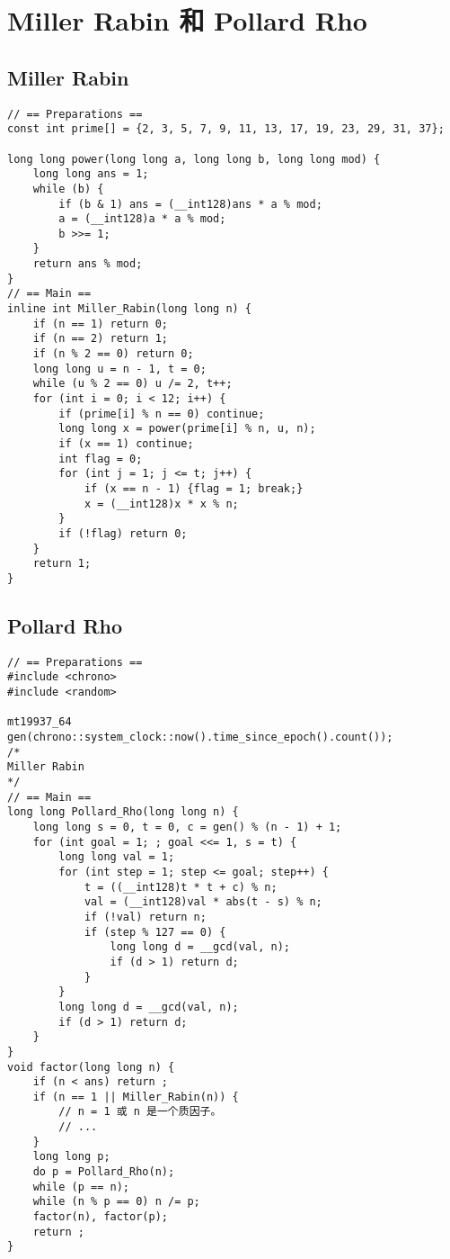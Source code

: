 \section{Miller Rabin 和 Pollard Rho}

\subsection{Miller Rabin}

\begin{verbatim}
// == Preparations ==
const int prime[] = {2, 3, 5, 7, 9, 11, 13, 17, 19, 23, 29, 31, 37};

long long power(long long a, long long b, long long mod) {
    long long ans = 1;
    while (b) {
        if (b & 1) ans = (__int128)ans * a % mod;
        a = (__int128)a * a % mod;
        b >>= 1;
    }
    return ans % mod;
}
// == Main ==
inline int Miller_Rabin(long long n) {
    if (n == 1) return 0;
    if (n == 2) return 1;
    if (n % 2 == 0) return 0;
    long long u = n - 1, t = 0;
    while (u % 2 == 0) u /= 2, t++;
    for (int i = 0; i < 12; i++) {
        if (prime[i] % n == 0) continue;
        long long x = power(prime[i] % n, u, n);
        if (x == 1) continue;
        int flag = 0;
        for (int j = 1; j <= t; j++) {
            if (x == n - 1) {flag = 1; break;}
            x = (__int128)x * x % n;
        }
        if (!flag) return 0;
    }
    return 1;
}
\end{verbatim}

\subsection{Pollard Rho}

\begin{verbatim}
// == Preparations ==
#include <chrono>
#include <random>

mt19937_64 gen(chrono::system_clock::now().time_since_epoch().count());
/*
Miller Rabin
*/
// == Main ==
long long Pollard_Rho(long long n) {
    long long s = 0, t = 0, c = gen() % (n - 1) + 1;
    for (int goal = 1; ; goal <<= 1, s = t) {
        long long val = 1;
        for (int step = 1; step <= goal; step++) {
            t = ((__int128)t * t + c) % n;
            val = (__int128)val * abs(t - s) % n;
            if (!val) return n;
            if (step % 127 == 0) {
                long long d = __gcd(val, n);
                if (d > 1) return d;
            }
        }
        long long d = __gcd(val, n);
        if (d > 1) return d;
    }
}
void factor(long long n) {
    if (n < ans) return ;
    if (n == 1 || Miller_Rabin(n)) {
        // n = 1 或 n 是一个质因子。
        // ...
    }
    long long p;
    do p = Pollard_Rho(n);
    while (p == n);
    while (n % p == 0) n /= p;
    factor(n), factor(p);
    return ;
}
\end{verbatim}